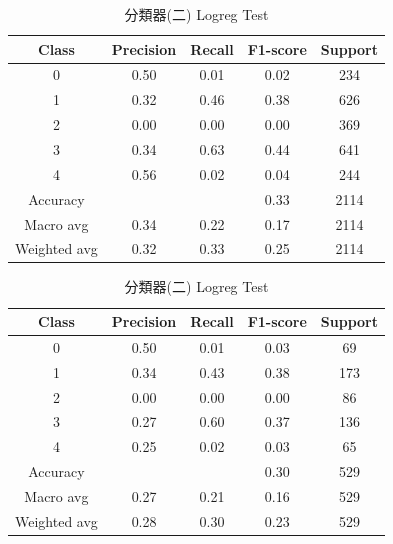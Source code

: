 \begin{enumerate}
\begin{enumerate}
                \begin{table}[H]
                \centering
                \scriptsize
                \begin{minipage}{0.48\textwidth}
                \centering
                \begin{tabular}{c|cccc}
                \hline
                Class & Precision & Recall & F1-score & Support \\
                \hline
                0 & 0.50 & 0.01 & 0.02 & 234 \\
                1 & 0.32 & 0.46 & 0.38 & 626 \\
                2 & 0.00 & 0.00 & 0.00 & 369 \\
                3 & 0.34 & 0.63 & 0.44 & 641 \\
                4 & 0.56 & 0.02 & 0.04 & 244 \\
                \hline
                Accuracy &       &      & 0.33 & 2114 \\
                Macro avg & 0.34 & 0.22 & 0.17 & 2114 \\
                Weighted avg & 0.32 & 0.33 & 0.25 & 2114 \\
                \hline
                \end{tabular}
                \caption{分類器(二) Logreg Train}
                \label{tab:classifier_2_report_train_sgd_logreg_non_filtered}
                \end{minipage}%
                \hfill
                \begin{minipage}{0.48\textwidth}
                \centering
                \begin{tabular}{c|cccc}
                \hline
                Class & Precision & Recall & F1-score & Support \\
                \hline
                0 & 0.50 & 0.01 & 0.03 & 69 \\
                1 & 0.34 & 0.43 & 0.38 & 173 \\
                2 & 0.00 & 0.00 & 0.00 & 86 \\
                3 & 0.27 & 0.60 & 0.37 & 136 \\
                4 & 0.25 & 0.02 & 0.03 & 65 \\
                \hline
                Accuracy &       &      & 0.30 & 529 \\
                Macro avg & 0.27 & 0.21 & 0.16 & 529 \\
                Weighted avg & 0.28 & 0.30 & 0.23 & 529 \\
                \hline
                \end{tabular}
                \caption{分類器(二) Logreg Test}
                \label{tab:classifier_2_report_test_sgd_logreg_non_filtered}
                \end{minipage}
                \end{table}


\end{enumerate}
\end{enumerate}
